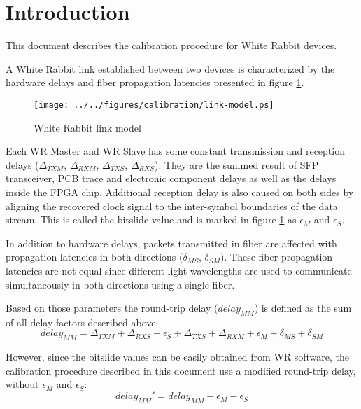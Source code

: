 \section{Introduction}

This document describes the calibration procedure for White Rabbit devices. 

A White Rabbit link established between two devices is characterized by the
hardware delays and fiber propagation latencies presented in figure
\ref{fig:intro:link-model}.

\begin{figure}[ht]
	\begin{center}
		\texttt{[image: ../../figures/calibration/link-model.ps]}
		\caption{White Rabbit link model}
		\label{fig:intro:link-model}
	\end{center}
\end{figure}

Each WR Master and WR Slave has some constant transmission and reception delays
($\Delta_{TXM}$, $\Delta_{RXM}$, $\Delta_{TXS}$, $\Delta_{RXS}$). They are the
summed result of SFP transceiver, PCB trace and electronic component
delays as well as the delays inside the FPGA chip. Additional reception delay is
also caused on both sides by aligning the recovered clock signal to the inter-symbol
boundaries of the data stream. This is called the bitslide value and is marked in figure
\ref{fig:intro:link-model} as $\epsilon_M$ and $\epsilon_S$.

In addition to hardware delays, packets transmitted in fiber are affected with
propagation latencies in both directions ($\delta_{MS}$, $\delta_{SM}$). These
fiber propagation latencies are not equal since different light wavelengths are 
used to communicate simultaneously in both directions using a single fiber.

Based on those parameters the round-trip delay ($delay_{MM}$) is defined as the
sum of all delay factors described above:
\begin{equation}
	delay_{MM} = \Delta_{TXM} + \Delta_{RXS} + \epsilon_S + \Delta_{TXS} +
	\Delta_{RXM} + \epsilon_M + \delta_{MS} + \delta_{SM}
\end{equation}

However, since the bitslide values can be easily obtained from WR software, 
the calibration procedure described in this document use a modified round-trip delay, 
without $\epsilon_M$ and $\epsilon_S$:
\begin{equation}
	delay_{MM}' = delay_{MM} - \epsilon_M - \epsilon_S
\end{equation}

